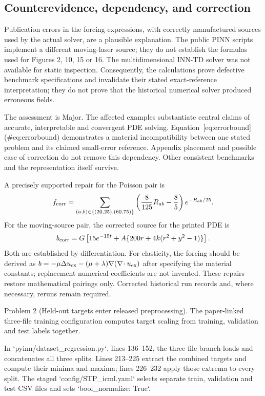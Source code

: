 \documentclass[10pt]{article}
\begin{document}
\subsection*{Counterevidence, dependency, and correction}
Publication errors in the forcing expressions, with correctly manufactured sources used by the actual solver, are a plausible explanation. The public PINN scripts implement a different moving-laser source; they do not establish the formulas used for Figures 2, 10, 15 or 16. The multidimensional INN-TD solver was not available for static inspection. Consequently, the calculations prove defective benchmark specifications and invalidate their stated exact-reference interpretation; they do not prove that the historical numerical solver produced erroneous fields.\par
The assessment is Major. The affected examples substantiate central claims of accurate, interpretable and convergent PDE solving. Equation [eq:errorbound] (\#eq:errorbound) demonstrates a material incompatibility between one stated problem and its claimed small-error reference. Appendix placement and possible ease of correction do not remove this dependency. Other consistent benchmarks and the representation itself survive.\par
A precisely supported repair for the Poisson pair is \[f_{\rm corr}=\sum_{(a,b)\in\{(20,25),(60,75)\}}
 \left(\frac8{125}R_{ab}-\frac85\right)e^{-R_{ab}/25}.\] For the moving-source pair, the corrected source for the printed PDE is \[b_{\rm corr}=G\left[15e^{-15t}
 +A\{200r+4k(r^2+y^2-1)\}\right].\] Both are established by differentiation. For elasticity, the forcing should be derived as \(b=-\mu\Delta u_{\rm ex}-(\mu+\lambda)\nabla(\nabla\!\cdot u_{\rm ex})\) after specifying the material constants; replacement numerical coefficients are not invented. These repairs restore mathematical pairings only. Corrected historical run records and, where necessary, reruns remain required.\par
Problem 2 (Held-out targets enter released preprocessing).  The paper-linked three-file training configuration computes target scaling from training, validation and test labels together.\par
In `pyinn/dataset\_regression.py`, lines 136–152, the three-file branch loads and concatenates all three splits. Lines 213–225 extract the combined targets and compute their minima and maxima; lines 226–232 apply those extrema to every split. The staged `config/STP\_icml.yaml` selects separate train, validation and test CSV files and sets `bool\_normalize: True`.\par
\end{document}
